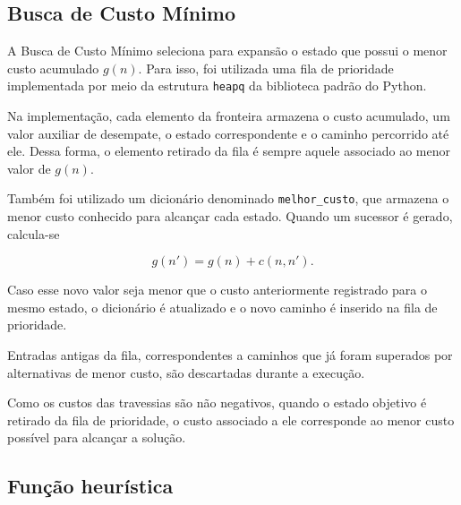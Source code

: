 \documentclass[12pt,a4paper]{article}
\begin{document}



\subsection{Busca de Custo Mínimo}

A Busca de Custo Mínimo seleciona para expansão o estado que possui o menor
custo acumulado $g(n)$. Para isso, foi utilizada uma fila de prioridade
implementada por meio da estrutura \texttt{heapq} da biblioteca padrão do
Python.

Na implementação, cada elemento da fronteira armazena o custo acumulado, um
valor auxiliar de desempate, o estado correspondente e o caminho percorrido
até ele. Dessa forma, o elemento retirado da fila é sempre aquele associado ao
menor valor de $g(n)$.

Também foi utilizado um dicionário denominado \texttt{melhor\_custo}, que
armazena o menor custo conhecido para alcançar cada estado. Quando um sucessor
é gerado, calcula-se

\[
g(n') = g(n) + c(n,n').
\]

Caso esse novo valor seja menor que o custo anteriormente registrado para o
mesmo estado, o dicionário é atualizado e o novo caminho é inserido na fila de
prioridade.

Entradas antigas da fila, correspondentes a caminhos que já foram superados
por alternativas de menor custo, são descartadas durante a execução.

Como os custos das travessias são não negativos, quando o estado objetivo é
retirado da fila de prioridade, o custo associado a ele corresponde ao menor
custo possível para alcançar a solução.




\subsection{Função heurística}
\end{document}
